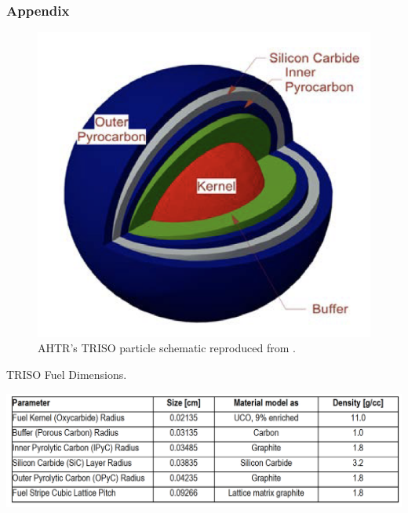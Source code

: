 \begin{frame}
    \frametitle{Appendix}
    \begin{figure}[]
        \centering
        \includegraphics[width=0.35\linewidth]{../docs/figures/ahtr-triso.png} 
        \caption{AHTR's TRISO particle schematic reproduced from 
        \cite{noauthor_fluoride_nodate}.}
    \end{figure}
    \vspace{-0.5cm}
    \begin{table}
        \caption{TRISO Fuel Dimensions.}
        \includegraphics[width=0.55\linewidth]{figures/triso-dimensions.png} 
    \end{table}
\end{frame}